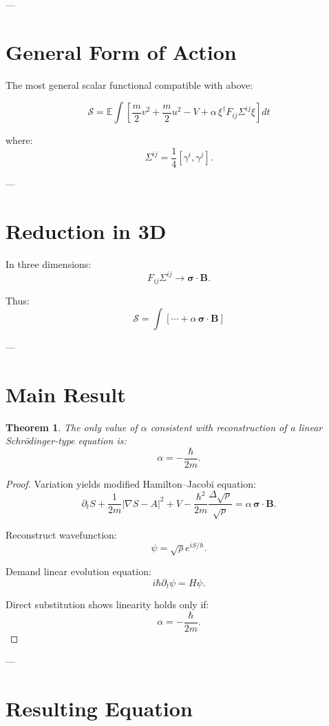 \documentclass[11pt]{article}
\newtheorem{theorem}{Theorem}
\begin{document}
---

\section{General Form of Action}

The most general scalar functional compatible with above:

\[
\mathcal{S} =
\mathbb{E}\int
\left[
\frac{m}{2}v^2 + \frac{m}{2}u^2 - V
+ \alpha\, \xi^\dagger F_{ij}\Sigma^{ij}\xi
\right] dt
\]

where:
\[
\Sigma^{ij} = \frac{1}{4}[\gamma^i,\gamma^j].
\]

---

\section{Reduction in 3D}

In three dimensions:
\[
F_{ij}\Sigma^{ij} \rightarrow \bm{\sigma}\cdot \bm{B}.
\]

Thus:
\[
\mathcal{S} =
\int
\left[
\cdots + \alpha\, \bm{\sigma}\cdot \bm{B}
\right]
\]

---

\section{Main Result}

\begin{theorem}
The only value of $\alpha$ consistent with reconstruction of a linear Schr\"odinger-type equation is:
\[
\alpha = -\frac{\hbar}{2m}.
\]
\end{theorem}

\begin{proof}
Variation yields modified Hamilton–Jacobi equation:
\[
\partial_t S + \frac{1}{2m}|\nabla S - A|^2 + V
- \frac{\hbar^2}{2m}\frac{\Delta \sqrt{\rho}}{\sqrt{\rho}}
= \alpha\, \bm{\sigma}\cdot \bm{B}.
\]

Reconstruct wavefunction:
\[
\psi = \sqrt{\rho} e^{iS/\hbar}.
\]

Demand linear evolution equation:
\[
i\hbar \partial_t \psi = H\psi.
\]

Direct substitution shows linearity holds only if:
\[
\alpha = -\frac{\hbar}{2m}.
\]
\end{proof}

---

\section{Resulting Equation}
\end{document}
